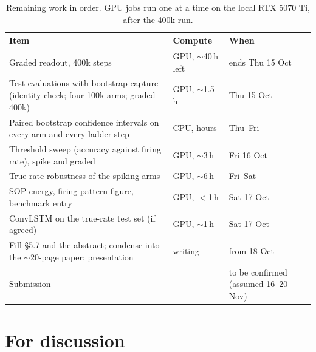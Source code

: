 \documentclass[10pt,a4paper]{article}
\begin{document}
\begin{table}[htbp]
\centering\small
\caption{Remaining work in order. GPU jobs run one at a time on the local RTX 5070 Ti, after the 400k run.}
\label{tab:remaining}
\begin{tabularx}{\textwidth}{@{}Y l l@{}}
\toprule
\textbf{Item} & \textbf{Compute} & \textbf{When} \\
\midrule
Graded readout, 400k steps & GPU, $\sim$40\,h left & ends Thu 15 Oct \\
Test evaluations with bootstrap capture (identity check; four 100k arms; graded 400k) & GPU, $\sim$1.5\,h & Thu 15 Oct \\
Paired bootstrap confidence intervals on every arm and every ladder step & CPU, hours & Thu--Fri \\
Threshold sweep (accuracy against firing rate), spike and graded & GPU, $\sim$3\,h & Fri 16 Oct \\
True-rate robustness of the spiking arms & GPU, $\sim$6\,h & Fri--Sat \\
SOP energy, firing-pattern figure, benchmark entry & GPU, $<$1\,h & Sat 17 Oct \\
ConvLSTM on the true-rate test set (if agreed) & GPU, $\sim$1\,h & Sat 17 Oct \\
Fill §5.7 and the abstract; condense into the $\sim$20-page paper; presentation & writing & from 18 Oct \\
Submission & --- & to be confirmed (assumed 16--20 Nov) \\
\bottomrule
\end{tabularx}
\end{table}

\section{For discussion}
\label{sec:discussion}
\end{document}
